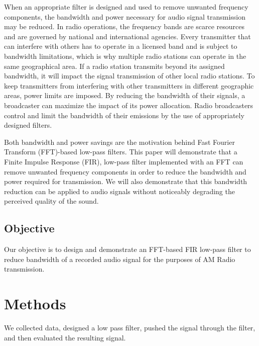 When an appropriate filter is designed and used to remove
unwanted frequency components, the bandwidth and power
necessary for audio signal transmission may be reduced. In
radio operations, the frequency bands are scarce resources and
are governed by national and international agencies. Every
transmitter that can interfere with others has to operate in a
licensed band and is subject to bandwidth limitations, which is
why multiple radio stations can operate in the same geographical
area. If a radio station transmits beyond its assigned bandwidth,
it will impact the signal transmission of other local radio
stations. To keep transmitters from interfering with other
transmitters in different geographic areas, power limits are
imposed. By reducing the bandwidth of their signals, a
broadcaster can maximize the impact of its power allocation.
Radio broadcasters control and limit the bandwidth of their
emissions by the use of appropriately designed  
filters\cite{notes:class}.

Both bandwidth and power savings are the motivation behind Fast
Fourier Transform (FFT)-based low-pass filters. This paper will
demonstrate that a Finite Impulse Response (FIR), low-pass filter
implemented with an FFT can remove unwanted frequency components in
order to reduce the bandwidth and power required for  
transmission.  We will also demonstrate that this bandwidth reduction
can be applied to audio signals without noticeably degrading the 
perceived quality of the sound.

\subsection{Objective}

Our objective is to design and demonstrate an FFT-based FIR
low-pass filter to reduce bandwidth of a recorded audio signal
for the purposes of AM Radio transmission.

\section{Methods}

We collected data, designed a low pass filter, pushed the signal
through the filter, and then evaluated the resulting signal.







